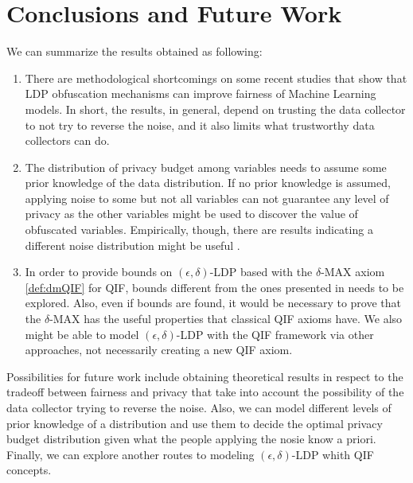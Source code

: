 \documentclass[conference]{IEEEtran}
\begin{document}
\section{Conclusions and Future Work}

We can summarize the results obtained as following:

\begin{enumerate}
	\item There are methodological shortcomings on some recent studies that show that LDP obfuscation mechanisms can improve fairness of Machine Learning models. In short, the results, in general, depend on trusting the data collector to not try to reverse the noise, and it also limits what trustworthy data collectors can do.
	\item The distribution of privacy budget among variables needs to assume some prior knowledge of the data distribution. If no prior knowledge is assumed, applying noise to some but not all variables can not guarantee any level of privacy as the other variables might be used to discover the value of obfuscated variables. Empirically, though, there are results indicating a different noise distribution might be useful \cite{arcolezi2023local}.
	\item In order to provide bounds on $(\epsilon,\delta)$-LDP based with the $\delta$-MAX axiom \ref{def:dmQIF} for QIF, bounds different from the ones presented in \cite{fernandes2024explaining} needs to be explored. Also, even if bounds are found, it would be necessary to prove that the $\delta$-MAX has the useful properties that classical QIF axioms have. We also might be able to model $(\epsilon,\delta)$-LDP with the QIF framework via other approaches, not necessarily creating a new QIF axiom.
\end{enumerate}

Possibilities for future work include obtaining theoretical results in respect to the tradeoff between fairness and privacy that take into account the possibility of the data collector trying to reverse the noise. Also, we can model different levels of prior knowledge of a distribution and use them to decide the optimal privacy budget distribution given what the people applying the nosie know a priori. Finally, we can explore another routes to modeling $(\epsilon,\delta)$-LDP whith QIF concepts.



\end{document}
